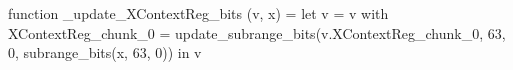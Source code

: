 function _update_XContextReg_bits (v, x) = let v = { v with XContextReg_chunk_0 = update_subrange_bits(v.XContextReg_chunk_0, 63, 0, subrange_bits(x, 63, 0)) } in
  v
